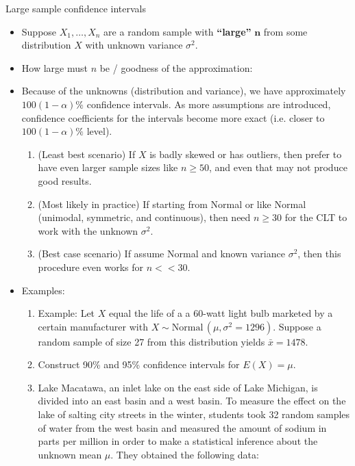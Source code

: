 \documentclass{article}
\newcommand{\vecn}[2]{#1_1, \ldots, #1_{#2}}	%
\newcommand{\follow}[1]{\sim \text{#1}\,}		%
\begin{document}
Large sample confidence intervals\bigskip
\begin{itemize}
    \item Suppose $\vecn{X}{n}$ are a random sample with \textbf{``large''} $\boldsymbol{n}$ from some  distribution $X$ with unknown variance $\sigma^2$.\vspace{130pt}
    \item How large must $n$ be / goodness of the approximation:
    \item[] Because of the unknowns (distribution and variance), we have approximately \\$100(1 - \alpha)\%$ confidence intervals. As more assumptions are introduced, confidence coefficients for the intervals become more exact (i.e. closer to $100(1 - \alpha)\%$ level).
    \begin{enumerate}
        \item (Least best scenario) If $X$ is badly skewed or has outliers, then prefer to have even larger sample sizes like $n \ge 50$, and even that may not produce good results.
        \item (Most likely in practice) If starting from Normal or like Normal (unimodal, symmetric, and continuous), then need $n \ge 30$ for the CLT to work with the unknown $\sigma^2$.
        \item (Best case scenario) If assume Normal and known variance $\sigma^2$, then this procedure even works for $n << 30$.
    \end{enumerate}
    \item Examples:
    \begin{enumerate}
        \item Example: Let $X$ equal the life of a a 60-watt light bulb marketed by a certain manufacturer with $X \follow{Normal}(\mu, \sigma^2 = 1296)$. Suppose a random sample of size 27 from this distribution yields $\bar{x} = 1478$.
        \item[] Construct 90\% and 95\% confidence intervals for $E(X) = \mu$.\vspace{130pt}        
        \item Lake Macatawa, an inlet lake on the east side of Lake Michigan, is divided into an east basin and a west basin. To measure the effect on the lake of salting city streets in the winter, students took 32 random samples of water from the west basin and measured the amount of sodium in parts per million in order to make a statistical inference about the unknown mean $\mu$. They obtained the following data:
        \begin{figure}[H]

\end{figure}
\end{enumerate}
\end{itemize}
\end{document}
